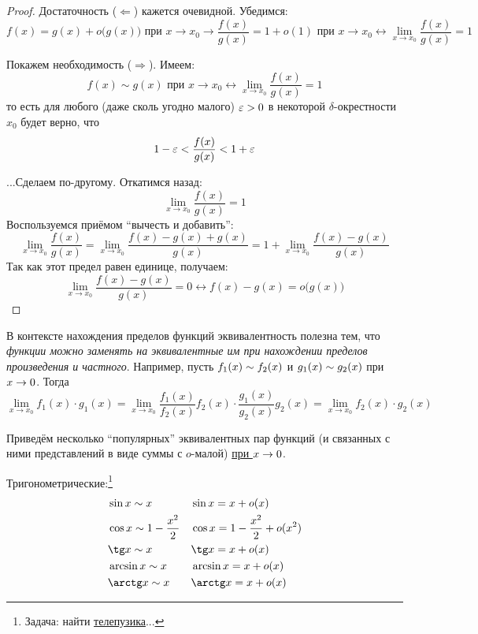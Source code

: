 \documentclass[a4paper,12pt]{article}
\begin{document}
  \begin{proof}
      Достаточность ($\Leftarrow$) кажется очевидной.
      Убедимся:
      \[
        f(x) = g(x) + o\bigl(g(x)\bigr) \mbox{ при } x \to x_0
          \rightarrow \frac{f(x)}{g(x)} = 1 + o(1) \mbox{ при } x \to x_0
          \leftrightarrow \lim_{x \to x_0} \frac{f(x)}{g(x)} = 1
      \]

      Покажем необходимость ($\Rightarrow$).
      Имеем:
      \[
        f(x) \sim g(x) \mbox{ при } x \to x_0
          \leftrightarrow \lim_{x \to x_0} \frac{f(x)}{g(x)} = 1
      \]
      то есть для любого (даже сколь угодно малого) $\eps \hm> 0$ в некоторой $\delta$-окрестности $x_0$ будет верно, что
      \[
        1 - \varepsilon < \frac{f(x)}{g(x)} < 1 + \varepsilon
      \]

      ...Сделаем по-другому.
      Откатимся назад:
      \[
        \lim_{x \to x_0} \frac{f(x)}{g(x)} = 1
      \]
      Воспользуемся приёмом ``вычесть и добавить'':
      \[
        \lim_{x \to x_0} \frac{f(x)}{g(x)}
          = \lim_{x \to x_0} \frac{f(x) - g(x) + g(x)}{g(x)}
          = 1 + \lim_{x \to x_0} \frac{f(x) - g(x)}{g(x)}
      \]
      Так как этот предел равен единице, получаем:
      \[
        \lim_{x \to x_0} \frac{f(x) - g(x)}{g(x)} = 0
          \leftrightarrow f(x) - g(x) = o\bigl(g(x)\bigr)
      \]
  \end{proof}

  В контексте нахождения пределов функций эквивалентность полезна тем, что \emph{функции можно заменять на эквивалентные им при нахождении пределов произведения и частного}.
  Например, пусть $f_1(x) \hm\sim f_2(x)$ и $g_1(x) \hm\sim g_2(x)$ при $x \hm\to 0$.
  Тогда
  \[
    \lim_{x \to x_0} f_1(x) \cdot g_1(x)
      = \lim_{x \to x_0} \frac{f_1(x)}{f_2(x)} f_2(x) \cdot \frac{g_1(x)}{g_2(x)} g_2(x)
      = \lim_{x \to x_0} f_2(x) \cdot g_2(x)
  \]

  Приведём несколько ``популярных'' эквивалентных пар функций (и связанных с ними представлений в виде суммы с $o$-малой) \underline{при $x \hm\to 0$}.

  Тригонометрические:\footnote{
    Задача: найти \href{https://knowyourmeme.com/memes/tinky-winky-joins-hand-stacking}{телепузика}...
  }
  \[
    \begin{aligned}
      &\sin x     \sim x                  & &\sin x = x + o(x)\\
      &\cos x     \sim 1 - \frac{x^2}{2}  & &\cos x = 1 - \frac{x^2}{2} + o(x^2)\\
      &\tg x      \sim x                  & &\tg x = x + o(x)\\
      &\arcsin x  \sim x                  & &\arcsin x = x + o(x)\\
      &\arctg x   \sim x                  & &\arctg x = x + o(x)
    \end{aligned}
  \]
\end{document}
